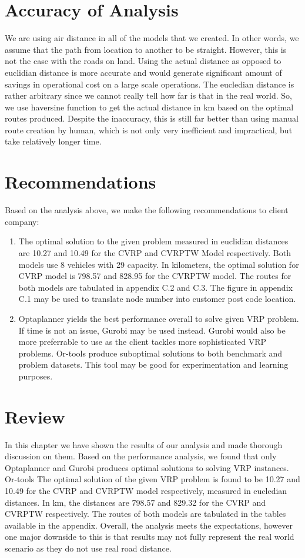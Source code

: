 \section{Accuracy of Analysis}
We are using air distance in all of the models that we created. In other words, we assume that the path from location to another to be straight.
However, this is not  the case with the roads on land. Using the actual distance as opposed to euclidian distance is
more accurate and would generate significant amount of savings in operational cost on a
large scale operations.  The eucledian distance is rather arbitrary since we cannot really tell how far is that in the
real world. So, we use haversine function to get the actual distance in km based on the optimal routes produced.
Despite the inaccuracy, this is still far better than using manual route creation by human, which is not only very
inefficient and impractical, but take relatively longer time.

\section{Recommendations}
Based on the analysis above, we make the following recommendations to client company:
\begin{enumerate}
\item The optimal solution to the given problem measured in euclidian distances are 10.27 and 10.49 for the CVRP and CVRPTW Model respectively.
Both models use 8 vehicles with 29 capacity. In kilometers, the optimal solution for CVRP model is 798.57 and 828.95 for the CVRPTW model.
The routes for both models are tabulated in appendix C.2 and C.3. The figure in appendix C.1 may be used to translate
node number into customer post code location.
\item Optaplanner yields the best performance overall to solve given VRP problem. If time is not an issue, Gurobi may
be used instead. Gurobi would also be more preferrable to use as the client tackles more sophisticated VRP problems. Or-tools produce
suboptimal solutions to both benchmark and problem datasets. This tool may be good for experimentation and learning purposes.
\end{enumerate}

\section{Review}
In this chapter we have shown the results of our analysis and made thorough discussion on them. Based on the
performance analysis, we found that only Optaplanner and Gurobi produces optimal solutions to solving VRP instances. Or-tools
The optimal solution of the given VRP problem is found to be 10.27 and 10.49 for the CVRP and
CVRPTW model respectively, measured in eucledian distances. In km, the distances are 798.57 and 829.32 for the CVRP and
CVRPTW respectively. The routes of both models are tabulated in the tables available in the appendix.  Overall, the
analysis meets the expectations, however one major downside to this is that results may  not fully represent the real
world scenario as they do not use real road distance.